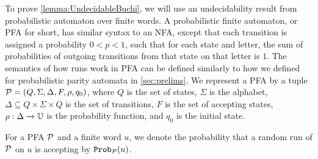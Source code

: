 To prove \cref{lemma:UndecidableBuchi}, we will use an undecidability result from probabilistic automaton over finite words. A probabilistic finite automaton, or PFA for short, has similar syntax to an NFA, except that each transition is assigned a probability $0<p<1$, such that for each state and letter, the sum of probabilities of outgoing transitions from that state on that letter is $1$. The semantics of how runs work in PFA can be defined similarly to how we defined for probabilistic parity automata in \cref{sec:prelims}. We represent a PFA by a tuple $\mathcal{P}=(Q,\Sigma,\Delta,F,\rho,q_0)$, where $Q$ is the set of states, $\Sigma$ is the alphabet, $\Delta \subseteq Q \times \Sigma \times Q$ is the set of transitions, $F$ is the set of accepting states,  $\rho:\Delta \xrightarrow{} \mathbb{U}$ is the probability function, and $q_0$ is the initial state.

For a PFA $\mathcal{P}$ and a finite word $u$, we denote the probability that a random run of $\mathcal{P}$ on $u$ is accepting by $\mathtt{Prob}_{\mathcal{P}} (u)$. 

